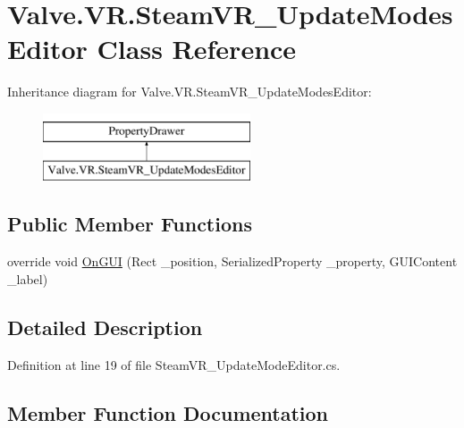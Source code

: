 \hypertarget{class_valve_1_1_v_r_1_1_steam_v_r___update_modes_editor}{}\section{Valve.\+V\+R.\+Steam\+V\+R\+\_\+\+Update\+Modes\+Editor Class Reference}
\label{class_valve_1_1_v_r_1_1_steam_v_r___update_modes_editor}
Inheritance diagram for Valve.\+V\+R.\+Steam\+V\+R\+\_\+\+Update\+Modes\+Editor\+:\begin{figure}[H]
\begin{center}
\leavevmode
\includegraphics[height=2.000000cm]{class_valve_1_1_v_r_1_1_steam_v_r___update_modes_editor}
\end{center}
\end{figure}
\subsection*{Public Member Functions}
\begin{DoxyCompactItemize}
\item 
override void \mbox{\hyperlink{class_valve_1_1_v_r_1_1_steam_v_r___update_modes_editor_a2e9bed7cc707ffcfbc292a64448bd41e}{On\+G\+UI}} (Rect \+\_\+position, Serialized\+Property \+\_\+property, G\+U\+I\+Content \+\_\+label)
\end{DoxyCompactItemize}


\subsection{Detailed Description}


Definition at line 19 of file Steam\+V\+R\+\_\+\+Update\+Mode\+Editor.\+cs.



\subsection{Member Function Documentation}
\mbox{\label{class_valve_1_1_v_r_1_1_steam_v_r___update_modes_editor_a2e9bed7cc707ffcfbc292a64448bd41e}} 
